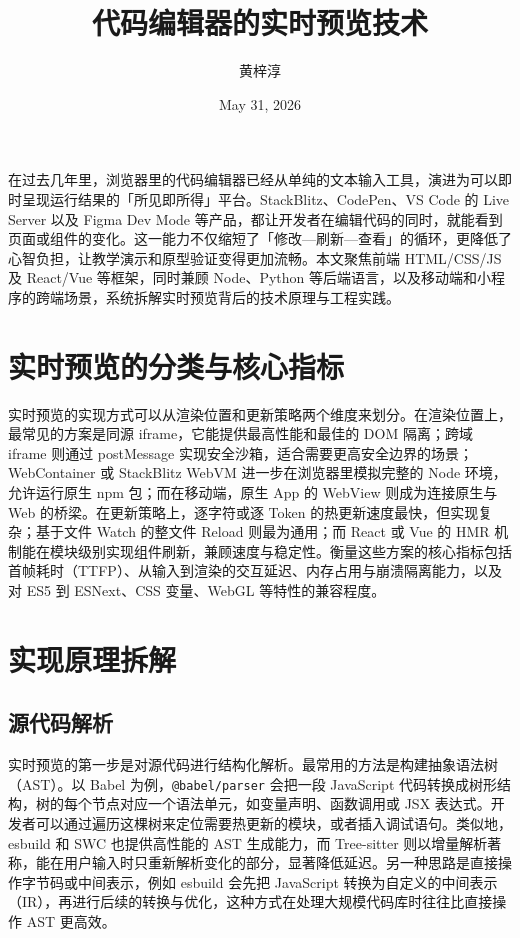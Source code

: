 \title{代码编辑器的实时预览技术}
\author{黄梓淳}
\date{May 31, 2026}
\maketitle
在过去几年里，浏览器里的代码编辑器已经从单纯的文本输入工具，演进为可以即时呈现运行结果的「所见即所得」平台。StackBlitz、CodePen、VS Code 的 Live Server 以及 Figma Dev Mode 等产品，都让开发者在编辑代码的同时，就能看到页面或组件的变化。这一能力不仅缩短了「修改—刷新—查看」的循环，更降低了心智负担，让教学演示和原型验证变得更加流畅。本文聚焦前端 HTML/CSS/JS 及 React/Vue 等框架，同时兼顾 Node、Python 等后端语言，以及移动端和小程序的跨端场景，系统拆解实时预览背后的技术原理与工程实践。\par
\chapter{实时预览的分类与核心指标}
实时预览的实现方式可以从渲染位置和更新策略两个维度来划分。在渲染位置上，最常见的方案是同源 iframe，它能提供最高性能和最佳的 DOM 隔离；跨域 iframe 则通过 postMessage 实现安全沙箱，适合需要更高安全边界的场景；WebContainer 或 StackBlitz WebVM 进一步在浏览器里模拟完整的 Node 环境，允许运行原生 npm 包；而在移动端，原生 App 的 WebView 则成为连接原生与 Web 的桥梁。在更新策略上，逐字符或逐 Token 的热更新速度最快，但实现复杂；基于文件 Watch 的整文件 Reload 则最为通用；而 React 或 Vue 的 HMR 机制能在模块级别实现组件刷新，兼顾速度与稳定性。衡量这些方案的核心指标包括首帧耗时（TTFP）、从输入到渲染的交互延迟、内存占用与崩溃隔离能力，以及对 ES5 到 ESNext、CSS 变量、WebGL 等特性的兼容程度。\par
\chapter{实现原理拆解}
\section{源代码解析}
实时预览的第一步是对源代码进行结构化解析。最常用的方法是构建抽象语法树（AST）。以 Babel 为例，\texttt{@babel/parser} 会把一段 JavaScript 代码转换成树形结构，树的每个节点对应一个语法单元，如变量声明、函数调用或 JSX 表达式。开发者可以通过遍历这棵树来定位需要热更新的模块，或者插入调试语句。类似地，esbuild 和 SWC 也提供高性能的 AST 生成能力，而 Tree-sitter 则以增量解析著称，能在用户输入时只重新解析变化的部分，显著降低延迟。另一种思路是直接操作字节码或中间表示，例如 esbuild 会先把 JavaScript 转换为自定义的中间表示（IR），再进行后续的转换与优化，这种方式在处理大规模代码库时往往比直接操作 AST 更高效。\par
